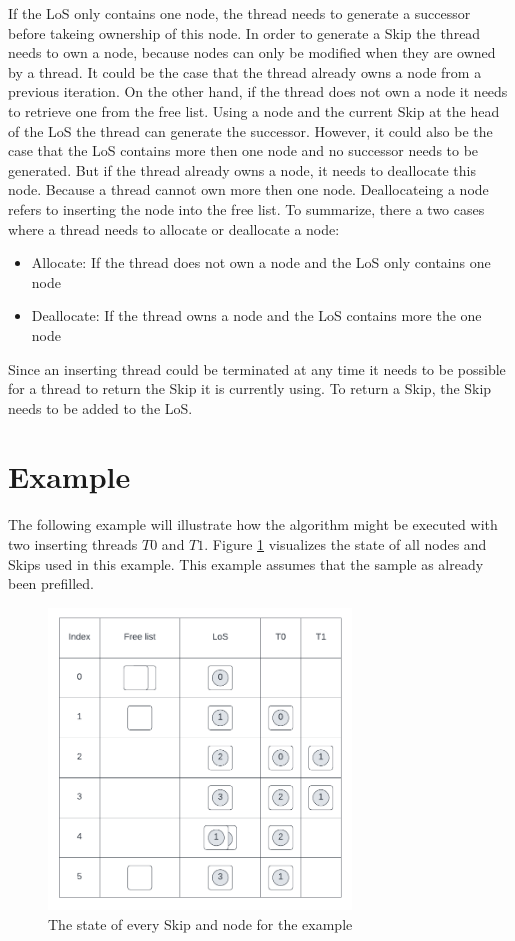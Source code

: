 \documentclass[sigconf,nonacm]{acmart}
\begin{document}
        If the LoS only contains one node, the thread needs to generate a successor before takeing ownership of this node. In order to generate a Skip the thread needs to own a node, because nodes can only be modified when they are owned by a thread. It could be the case that the thread already owns a node from a previous iteration. On the other hand, if the thread does not own a node it needs to retrieve one from the free list. Using a node and the current Skip at the head of the LoS the thread can generate the successor. However, it could also be the case that the LoS contains more then one node and no successor needs to be generated. But if the thread already owns a node, it needs to deallocate this node. Because a thread cannot own more then one node. Deallocateing a node refers to inserting the node into the free list. To summarize, there a two cases where a thread needs to allocate or deallocate a node: 
        \begin{itemize}
            \item Allocate: If the thread does not own a node and the LoS only contains one node
            \item Deallocate: If the thread owns a node and the LoS contains more the one node
        \end{itemize}

        Since an inserting thread could be terminated at any time it needs to be possible for a thread to return the Skip it is currently using. To return a Skip, the Skip needs to be added to the LoS.
        
    \section{Example}
        The following example will illustrate how the algorithm might be executed with two inserting threads $T0$ and $T1$. Figure \ref{fig:example} visualizes the state of all nodes and Skips used in this example. This example assumes that the sample as already been prefilled.
        \begin{figure}[H]
            \includegraphics[height=8cm]{figure6.pdf}
            \caption{The state of every Skip and node for the example}
            \label{fig:example}
        \end{figure}
\end{document}
